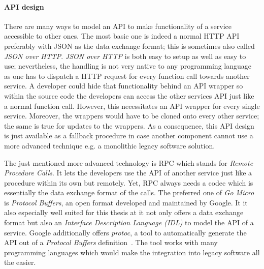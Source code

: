 \documentclass[12pt,a4paper,twoside]{report}
\begin{document}
\paragraph{API design} \label{construction-api_design}
There are many ways to model an API to make functionality of a service accessible
to other ones. The most basic one is indeed a normal HTTP API preferably with
JSON as the data exchange format; this is sometimes also called \textit{JSON over HTTP}.
\textit{JSON over HTTP} is both easy to setup as well as easy to use;
nevertheless, the handling is not very native to any programming language as one
has to dispatch a HTTP request for every function call towards another service.
A developer could hide that functionality behind an API wrapper so within the
source code the developers can access the other services API just like a normal
function call. However, this necessitates an API wrapper for every single service.
Moreover, the wrappers would have to be cloned onto every other service;
the same is true for updates to the wrappers.
As a consequence, this API design is just available as a fallback procedure
in case another component cannot use a more advanced technique e.g. a monolithic
legacy software solution.

The just mentioned more advanced technology is RPC which stands for
\textit{Remote Procedure Calls}.
It lets the developers use the API of another service just like a procedure within
its own but remotely. Yet, RPC always needs a codec which is essentially the
data exchange format of the calls. The preferred one of \textit{Go Micro}
is \textit{Protocol Buffers}, an open format developed and maintained by Google.
It it also especially well suited for this thesis at it not only offers a
data exchange format but also an \textit{Interface Description Language (IDL)}
to model the API of a service. Google additionally offers \textit{protoc},
a tool to automatically generate the API out of a \textit{Protocol Buffers}
definition~\cite{protobuf}. The tool works with many programming languages
which would make the integration into legacy software all the easier.
\end{document}
